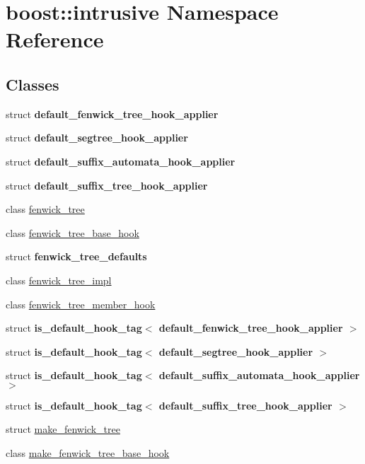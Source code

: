 \hypertarget{namespaceboost_1_1intrusive}{}\section{boost\+:\+:intrusive Namespace Reference}
\label{namespaceboost_1_1intrusive}
\subsection*{Classes}
\begin{DoxyCompactItemize}
\item 
struct {\bfseries default\+\_\+fenwick\+\_\+tree\+\_\+hook\+\_\+applier}
\item 
struct {\bfseries default\+\_\+segtree\+\_\+hook\+\_\+applier}
\item 
struct {\bfseries default\+\_\+suffix\+\_\+automata\+\_\+hook\+\_\+applier}
\item 
struct {\bfseries default\+\_\+suffix\+\_\+tree\+\_\+hook\+\_\+applier}
\item 
class \hyperlink{classboost_1_1intrusive_1_1fenwick__tree}{fenwick\+\_\+tree}
\item 
class \hyperlink{classboost_1_1intrusive_1_1fenwick__tree__base__hook}{fenwick\+\_\+tree\+\_\+base\+\_\+hook}
\item 
struct {\bfseries fenwick\+\_\+tree\+\_\+defaults}
\item 
class \hyperlink{classboost_1_1intrusive_1_1fenwick__tree__impl}{fenwick\+\_\+tree\+\_\+impl}
\item 
class \hyperlink{classboost_1_1intrusive_1_1fenwick__tree__member__hook}{fenwick\+\_\+tree\+\_\+member\+\_\+hook}
\item 
struct {\bfseries is\+\_\+default\+\_\+hook\+\_\+tag$<$ default\+\_\+fenwick\+\_\+tree\+\_\+hook\+\_\+applier $>$}
\item 
struct {\bfseries is\+\_\+default\+\_\+hook\+\_\+tag$<$ default\+\_\+segtree\+\_\+hook\+\_\+applier $>$}
\item 
struct {\bfseries is\+\_\+default\+\_\+hook\+\_\+tag$<$ default\+\_\+suffix\+\_\+automata\+\_\+hook\+\_\+applier $>$}
\item 
struct {\bfseries is\+\_\+default\+\_\+hook\+\_\+tag$<$ default\+\_\+suffix\+\_\+tree\+\_\+hook\+\_\+applier $>$}
\item 
struct \hyperlink{structboost_1_1intrusive_1_1make__fenwick__tree}{make\+\_\+fenwick\+\_\+tree}
\item 
class \hyperlink{classboost_1_1intrusive_1_1make__fenwick__tree__base__hook}{make\+\_\+fenwick\+\_\+tree\+\_\+base\+\_\+hook}

\end{DoxyCompactItemize}
